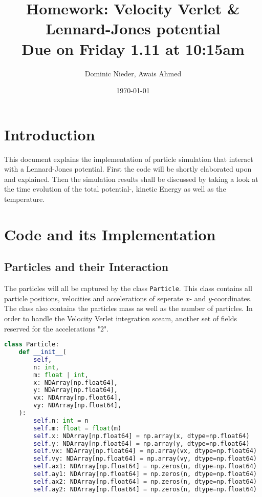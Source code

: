\documentclass{article}
\title{
    \vspace{2in}
    \textmd{\textbf{Homework: Velocity Verlet \& Lennard-Jones potential}}\\
    \normalsize\vspace{0.1in}\small{Due on Friday 1.11 at 10:15am}\\
    \vspace{0.1in}
    \vspace{3in}
}
\author{Dominic Nieder, Awais Ahmed}
\date{\today}
\begin{document}
\maketitle

\section{Introduction}

This document explains the implementation of particle simulation that interact with a Lennard-Jones potential. First the code will be shortly elaborated upon and explained. Then the simulation results shall be discussed by taking a look at the time evolution of the total potential-, kinetic Energy as well as the temperature.



\section{Code and its Implementation}

\subsection{Particles and their Interaction} \label{ParticlesAndInteractions}

The particles will all be captured by the class \texttt{Particle}. This class contains all particle positions, velocities and accelerations of seperate $x$- and $y$-coordinates. The class also contains the particles mass as well as the number of particles. In order to handle the Velocity Verlet integration sceam, another set of fields reserved for the accelerations "$2$".

\begin{lstlisting}[language=Python, caption=Particle class]
class Particle:
    def __init__(
        self,
        n: int,
        m: float | int,
        x: NDArray[np.float64],
        y: NDArray[np.float64],
        vx: NDArray[np.float64],
        vy: NDArray[np.float64],
    ):
        self.n: int = n
        self.m: float = float(m)
        self.x: NDArray[np.float64] = np.array(x, dtype=np.float64)
        self.y: NDArray[np.float64] = np.array(y, dtype=np.float64)
        self.vx: NDArray[np.float64] = np.array(vx, dtype=np.float64)
        self.vy: NDArray[np.float64] = np.array(vy, dtype=np.float64)
        self.ax1: NDArray[np.float64] = np.zeros(n, dtype=np.float64)
        self.ay1: NDArray[np.float64] = np.zeros(n, dtype=np.float64)
        self.ax2: NDArray[np.float64] = np.zeros(n, dtype=np.float64)
        self.ay2: NDArray[np.float64] = np.zeros(n, dtype=np.float64)
\end{lstlisting}
\end{document}
